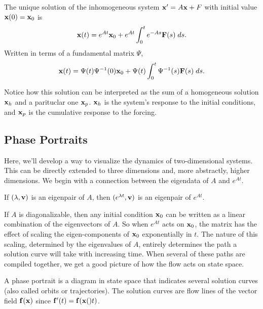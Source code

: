 \documentclass[../m082main.tex]{subfiles}
\begin{document}
\begin{theorem}
    The unique solution of the inhomogeneous system $\mathbf{x}' = A \mathbf{x} + F$ with initial value $\mathbf{x}(0) = \mathbf{x}_0$ is
    \[ \mathbf{x}(t) = e^{At} \mathbf{x}_0 + e^{At} \int_0^t e^{-As} \mathbf{F}(s) \;ds. \]
    Written in terms of a fundamental matrix $\Psi$,
    \[ \mathbf{x}(t) = \Psi(t) \Psi^{-1}(0) \mathbf{x}_0 + \Psi(t) \int_0^t \Psi^{-1}(s) \mathbf{F}(s) \;ds. \]
\end{theorem}

Notice how this solution can be interpreted as the sum of a homogeneous solution $\mathbf{x}_h$ and a parituclar one $\mathbf{x}_p$.
$\mathbf{x}_h$ is the system's response to the initial conditions, and $\mathbf{x}_p$ is the cumulative response to the forcing.

\subsection{Phase Portraits}
Here, we'll develop a way to visualize the dynamics of two-dimensional systems.
This can be directly extended to three dimensions and, more abstractly, higher dimensions.
We begin with a connection between the eigendata of $A$ and $e^{At}$.

\begin{theorem}
    If $(\lambda, \mathbf{v})$ is an eigenpair of $A$, then $(e^{\lambda t}, \mathbf{v})$ is an eigenpair of $e^{At}$.
\end{theorem}

If $A$ is diagonalizable, then any initial condition $\mathbf{x}_0$ can be written as a linear combination of the eigenvectors of $A$.
So when $e^{At}$ acts on $\mathbf{x}_0$, the matrix has the effect of scaling the eigen-components of $\mathbf{x}_0$ exponentially in $t$.
The nature of this scaling, determined by the eigenvalues of $A$, entirely determines the path a solution curve will take with increasing time.
When several of these paths are compiled together, we get a good picture of how the flow acts on state space.

\begin{definition}
    A phase portrait is a diagram in state space that indicates several solution curves (also called orbits or trajectories).
    The solution curves are flow lines of the vector field $\mathbf{f}(\mathbf{x})$ since $\mathbf{f}'(t) = \mathbf{f}(\mathbf{x}()t)$.
\end{definition}
\end{document}
